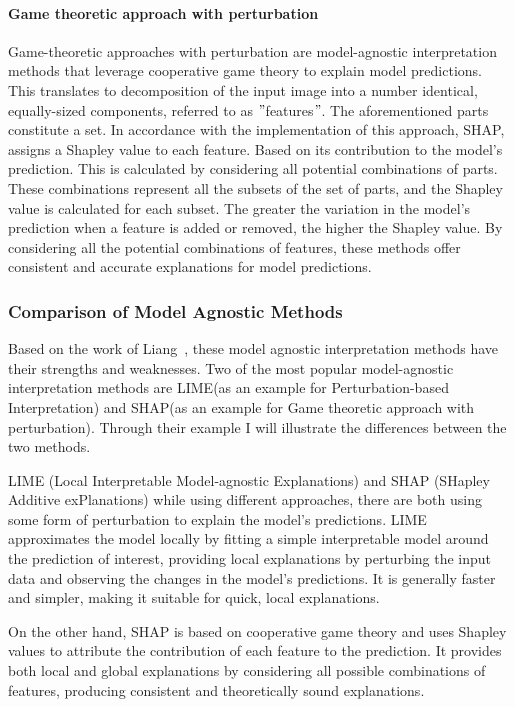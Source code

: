 \paragraph{Game theoretic approach with perturbation}\label{par:game-theoretic-approach-with-pertubation}

Game-theoretic approaches with perturbation are model-agnostic interpretation methods that leverage cooperative game theory to explain model predictions.
This translates to decomposition of the input image into a number identical, equally-sized components, referred to as \("\)features\("\).
The aforementioned parts constitute a set.
In accordance with the implementation of this approach, SHAP, assigns a Shapley value to each feature.
Based on its contribution to the model's prediction.
This is calculated by considering all potential combinations of parts.
These combinations represent all the subsets of the set of parts, and the Shapley value is calculated for each subset.
The greater the variation in the model's prediction when a feature is added or removed, the higher the Shapley value.
By considering all the potential combinations of features, these methods offer consistent and accurate explanations for model predictions.

\subsubsection{Comparison of Model Agnostic Methods}\label{subsubsec:comparison-of-model-agnostic-methods}
Based on the work of Liang~\cite{LIANG2021168}, these model agnostic interpretation methods have their strengths and weaknesses.
Two of the most popular model-agnostic interpretation methods are LIME(as an example for Perturbation-based Interpretation)
and SHAP(as an example for Game theoretic approach with perturbation).
Through their example I will illustrate the differences between the two methods.

LIME (Local Interpretable Model-agnostic Explanations) and SHAP (SHapley Additive exPlanations) while using
different approaches, there are both using some form of perturbation to explain the model's predictions.
LIME approximates the model locally by fitting a simple interpretable model around
the prediction of interest, providing local explanations by perturbing the input
data and observing the changes in the model's predictions.
It is generally faster and simpler, making it suitable for quick, local explanations.


On the other hand, SHAP is based on cooperative game theory and uses Shapley values to attribute the contribution of
each feature to the prediction.
It provides both local and global explanations by considering all possible combinations of features,
producing consistent and theoretically sound explanations.


